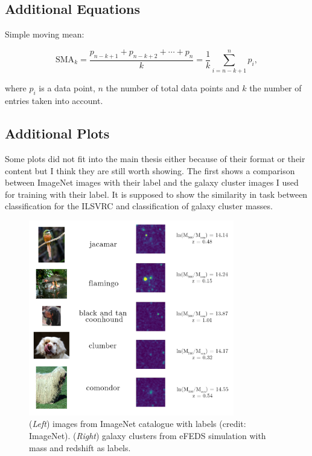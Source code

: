 \subsection{Additional Equations}

Simple moving mean:

\begin{equation}
    \text{SMA}_k = \frac{p_{n-k+1}+p_{n-k+2}+\cdots+p_n}{k} = \frac{1}{k}\sum_{i=n-k+1}^np_i,
    \label{rol_mean}
\end{equation}

where $p_i$ is a data point, $n$ the number of total data points and $k$ the number of entries taken into account.

\subsection{Additional Plots}
Some plots did not fit into the main thesis either because of their format or their content but I think they are still worth showing. The first shows a comparison between ImageNet images with their label and the galaxy cluster images I used for training with their label. It is supposed to show the similarity in task between classification for the ILSVRC and classification of galaxy cluster masses.

\begin{figure}[H]
 \centering
 \includegraphics[width=0.8\textwidth]{images/Chapter2/imagenet_clusters.png}
 \caption{(\textit{Left}) images from ImageNet catalogue with labels (credit: ImageNet). (\textit{Right}) galaxy clusters from eFEDS simulation with mass and redshift as labels.}
 \label{fig:imagenet_clusters}
\end{figure}

